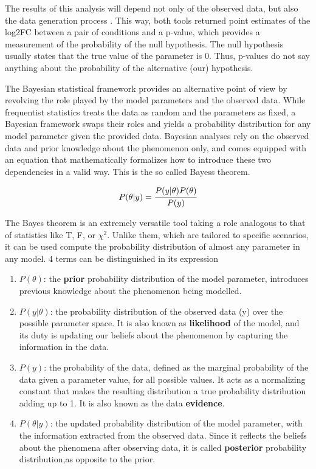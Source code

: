 The results of this analysis will depend not only of the observed data, but also the data generation process \cite{Kruschke}. This way, both tools returned point estimates of the log2FC between a pair of conditions and a p-value, which provides a measurement of the probability of the null hypothesis. The null hypothesis usually states that the true value of the parameter is 0. Thus, p-values do not say anything about the probability of the alternative (our) hypothesis.

The Bayesian statistical framework provides an alternative point of view by revolving the role played by the model parameters and the observed data. While frequentist statistics treats the data as random and the parameters as fixed, a Bayesian framework swaps their roles and yields a probability distribution for any model parameter given the provided data. Bayesian analyses rely on the observed data and prior knowledge about the phenomenon only, and comes equipped with an equation that mathematically formalizes how to introduce these two dependencies in a valid way. This is the so called Bayes\textquotesingle s theorem.

\begin{equation}
P(\theta | y) = \cfrac{P(y | \theta) P(\theta)}{P(y)}
\end{equation}

The Bayes theorem is an extremely versatile tool taking a role analogous to that of statistics like T, F, or $\chi^2$. Unlike them, which are tailored to specific scenarios, it can be used compute the probability distribution of almost any parameter in any model. 4 terms can be distinguished in its expression

\begin{enumerate}

\item $P(\theta)$: the \textbf{prior} probability distribution of the model parameter, introduces previous knowledge about the phenomenon being modelled.

\item $P(y | \theta)$: the probability distribution of the observed data (y) over the possible parameter space. It is also known as \textbf{likelihood} of the model, and its duty is updating our beliefs about the phenomenon by capturing the information in the data.

\item $P(y)$: the probability of the data, defined as the marginal probability of the data given a parameter value, for all possible values. It acts as a normalizing constant that makes the resulting distribution a true probability distribution adding up to 1. It is also known as the data \textbf{evidence}.

\item $P(\theta | y)$: the updated probability distribution of the model parameter, with the information extracted from the observed data. Since it reflects the beliefs about the phenomena after observing data, it is called \textbf{posterior} probability distribution,as opposite to the prior.

\end{enumerate}


